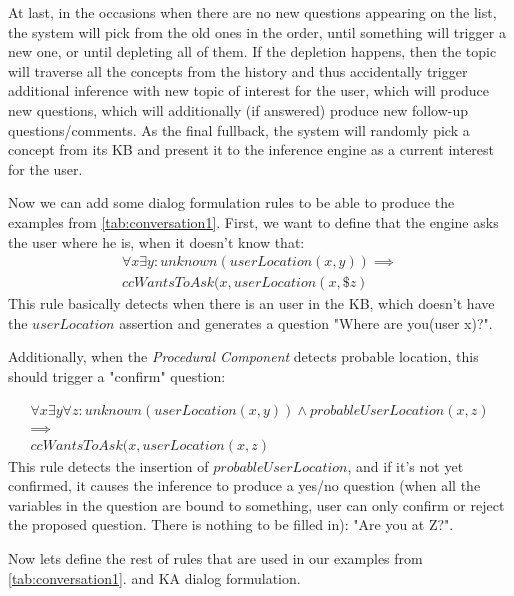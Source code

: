 At last, in the occasions when there are no new questions appearing on the list,
the system will pick from the old ones in the order, until something will 
trigger a new one, or until depleting all of them. If the depletion happens, 
then the topic will traverse all the concepts from the history and thus 
accidentally trigger additional inference with new topic of interest for the 
user, which will produce new questions, which will additionally (if answered) 
produce new follow-up questions/comments. As the final fullback, the system 
will randomly pick a concept from its KB and present it to the inference 
engine as a current interest for the user.

Now we can add some dialog formulation rules to be able to produce the
examples from \autoref{tab:conversation1}. First, we want to define that
the engine asks the user where he is, when it doesn't know that:
\begin{equation}\label{rule:userLoc}
\begin{gathered}
	\forall x \exists y:unknown(userLocation(x,y)) \implies \\
	ccWantsToAsk(x,userLocation(x,\$z)
\end{gathered}
\end{equation}
This rule basically detects when there is an user in the KB, which doesn't have
the $userLocation$ assertion and generates a question "Where are you(user x)?".

Additionally, when the \emph{Procedural Component} detects probable location,
this should trigger a "confirm" question:

\begin{equation}\label{rule:userLocConfirm}
\begin{gathered}
	\forall x \exists y \forall z:unknown(userLocation(x,y)) \land 
    probableUserLocation(x,z) 
    \\ \implies \\
	ccWantsToAsk(x,userLocation(x,z)
\end{gathered}
\end{equation}
This rule detects the insertion of $probableUserLocation$, and if it's not
yet confirmed, it causes the inference to produce a yes/no question (when
all the variables in the question are bound to something, user can only confirm
or reject the proposed question. There is nothing to be filled in):
"Are you at Z?".

Now lets define the rest of rules that are used in our examples 
from \autoref{tab:conversation1}. and KA dialog formulation.

